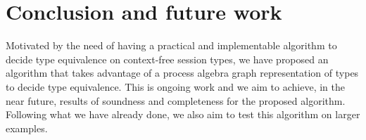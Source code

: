 \section{Conclusion and future work}
\label{sec:conclusion}

Motivated by the need of having a practical and implementable
algorithm to decide type equivalence on context-free session types, we
have proposed an algorithm that takes advantage of a process algebra
graph representation of types to decide type equivalence. This is
ongoing work and we aim to achieve, in the near future, results of
soundness and completeness for the proposed algorithm. Following what
we have already done, we also aim to test this algorithm on larger
examples.

